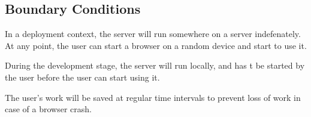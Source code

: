 \documentclass[a4paper]{article}
\begin{document}


\subsection{Boundary Conditions}

In a deployment context, the server will run somewhere on a server indefenately. At any point, the user can start a browser on a random device and start to use it.

During the development stage, the server will run locally, and has t be started by the user before the user can start using it.

The user's work will be saved at regular time intervals to prevent loss of work in case of a browser crash.
\end{document}

